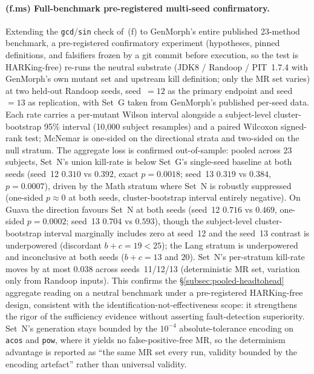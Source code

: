 \documentclass[acmsmall,screen,review]{acmart}
\begin{document}
\paragraph{(f.ms) Full-benchmark pre-registered multi-seed confirmatory.}
Extending the \texttt{gcd}/\texttt{sin} check of~(f) to GenMorph's entire published 23-method benchmark, a pre-registered confirmatory experiment (hypotheses, pinned definitions, and falsifiers frozen by a git commit before execution, so the test is HARKing-free) re-runs the neutral substrate (JDK8 / Randoop / PIT~1.7.4 with GenMorph's own mutant set and upstream kill definition; only the MR set varies) at two held-out Randoop seeds, seed~$=12$ as the primary endpoint and seed~$=13$ as replication, with Set~G taken from GenMorph's published per-seed data. Each rate carries a per-mutant Wilson interval alongside a subject-level cluster-bootstrap 95\% interval (10{,}000 subject resamples) and a paired Wilcoxon signed-rank test; McNemar is one-sided on the directional strata and two-sided on the null stratum. The aggregate loss is confirmed out-of-sample: pooled across 23 subjects, Set~N's union kill-rate is below Set~G's single-seed baseline at both seeds (seed~12 $0.310$ vs $0.392$, exact $p = 0.0018$; seed~13 $0.319$ vs $0.384$, $p = 0.0007$), driven by the Math stratum where Set~N is robustly suppressed (one-sided $p \approx 0$ at both seeds, cluster-bootstrap interval entirely negative). On Guava the direction favours Set~N at both seeds (seed~12 $0.716$ vs $0.469$, one-sided $p = 0.0002$; seed~13 $0.704$ vs $0.593$), though the subject-level cluster-bootstrap interval marginally includes zero at seed~12 and the seed~13 contrast is underpowered (discordant $b+c = 19 < 25$); the Lang stratum is underpowered and inconclusive at both seeds ($b+c = 13$ and $20$). Set~N's per-stratum kill-rate moves by at most $0.038$ across seeds~11/12/13 (deterministic MR set, variation only from Randoop inputs). This confirms the \S\ref{subsec:pooled-headtohead} aggregate reading on a neutral benchmark under a pre-registered HARKing-free design, consistent with the identification-not-effectiveness scope: it strengthens the rigor of the sufficiency evidence without asserting fault-detection superiority. Set~N's generation stays bounded by the $10^{-4}$ absolute-tolerance encoding on \texttt{acos} and \texttt{pow}, where it yields no false-positive-free MR, so the determinism advantage is reported as ``the same MR set every run, validity bounded by the encoding artefact'' rather than universal validity.
\end{document}
